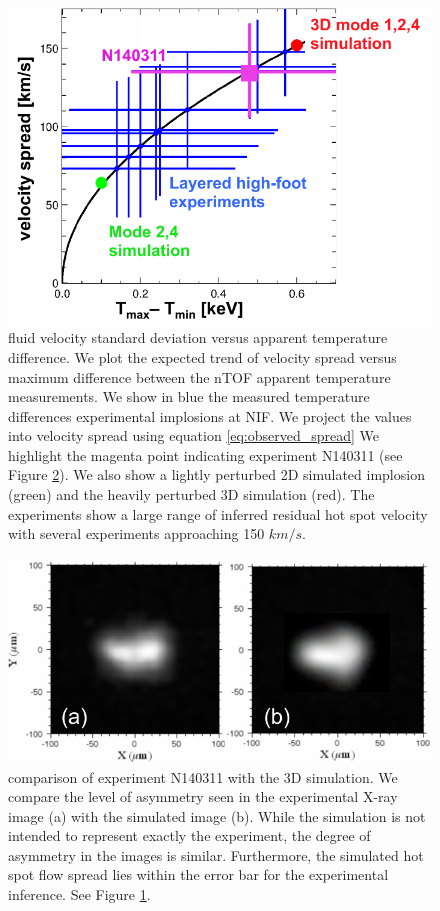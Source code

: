 \documentclass[aip,pop,numerical,reprint,floatfix]{revtex4-1}
\begin{document}
\begin{figure}[h]
\begin{centering}
\includegraphics[width=0.8\columnwidth]{residual_velocity}
\par\end{centering}

\caption{\label{fig:residual_velocity} fluid velocity standard deviation versus apparent temperature difference. We plot the expected trend of velocity spread versus maximum difference between the nTOF apparent temperature measurements. We show in blue the measured temperature differences experimental implosions at NIF. We project the values into velocity spread using equation \ref{eq:observed_spread} We highlight the magenta point indicating experiment N140311 (see Figure \ref{fig:xray_comparison_expt_sim}). We also show a lightly perturbed 2D simulated implosion (green) and the heavily perturbed 3D simulation (red). The experiments show a large range of inferred residual hot spot velocity with several experiments approaching 150 $km/s$.}
\end{figure}

\begin{figure}[h]
\begin{centering}
\includegraphics[width=0.8\columnwidth]{xray_comparison_expt_sim}
\par\end{centering}

\caption{\label{fig:xray_comparison_expt_sim}comparison of experiment N140311 with the 3D simulation. We compare the level of asymmetry seen in the experimental X-ray image (a) with the simulated image (b). While the simulation is not intended to represent exactly the experiment, the degree of asymmetry in the images is similar.  Furthermore, the simulated hot spot flow spread lies within the error bar for the experimental inference. See Figure \ref{fig:residual_velocity}. }
\end{figure}
\end{document}
